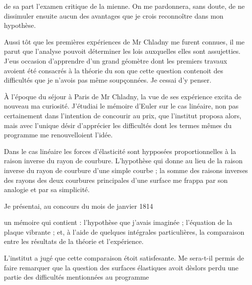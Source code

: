 \documentclass[11pt,a4paper]{article}
\begin{document}
de sa part l'examen critique de la mienne. On me pardonnera, sans doute, de ne
dissimuler ensuite aucun des avantages que je crois reconnoître dans mon
hypothèse.

Aussi tôt que les premières expériences de Mr Chladny me furent connues, il me
parut que l'analyse pouvoit déterminer les lois auxquelles elles sont
assujetties. J'eus occasion d'apprendre d'un grand géomètre dont les premiers
travaux avoient été consacrés à la théorie du son que cette question contenoit
des difficultés que je n'avois pas même soupçonnées. Je cessai d'y penser.

À l'époque du séjour à Paris de Mr Chladny, la vue de ses expérience excita de
nouveau ma curiosité. J'étudiai le mémoire d'Euler sur le cas linéaire, non
pas certainement dans l'intention de concourir au prix,
 que l'institut proposa alors, mais avec l'unique
désir d'apprécier les difficultés dont les termes mêmes du programme me
renouvelloient l'idée.

Dans le cas linéaire les forces d'élasticité sont hypposées proportionnelles à
la raison inverse du rayon de courbure. L'hypothèse qui donne au lieu de la
raison inverse du rayon de courbure d'une simple courbe ; la somme des raisons
inverses des rayons des deux courbures principales d'une surface me frappa par
son analogie et par sa simplicité.

Je présentai, au concours du mois de janvier 1814

un mémoire qui contient : l'hypothèse que j'avais imaginée ; l'équation de la
plaque vibrante ; et, à l'aide de quelques intégrales particulières, la
comparaison entre les résultats de la théorie et l'expérience.

L'institut a jugé que cette comparaison étoit satisfesante. Me sera-t-il
permis de faire remarquer que la question des surfaces élastiques avoit
dèslors perdu une partie des difficultés mentionnées au programme
\end{document}
